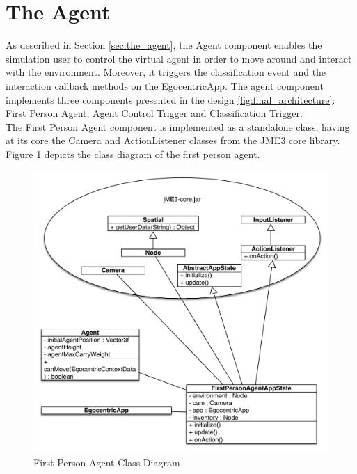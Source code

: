 \section{The Agent} %
\label{sec:impl_the_agent}
As described in Section \ref{sec:the_agent}, the Agent component enables the simulation user to control the virtual agent in order to move around and interact with the environment. Moreover, it triggers the classification event and the interaction callback methods on the EgocentricApp. The agent component implements three components presented in the design \ref{fig:final_architecture}: First Person Agent, Agent Control Trigger and Classification Trigger.\\

The First Person Agent component is implemented as a standalone class, having at its core the Camera and ActionListener classes from the JME3 core library. Figure \ref{fig:impl_first_person_agent} depicts the class diagram of the first person agent.
\begin{figure}[H]
	\centering
	\includegraphics[width=\linewidth]{gfx/Chapter4/first_person_agent}
	\caption{First Person Agent Class Diagram}
	\label{fig:impl_first_person_agent}
\end{figure}

